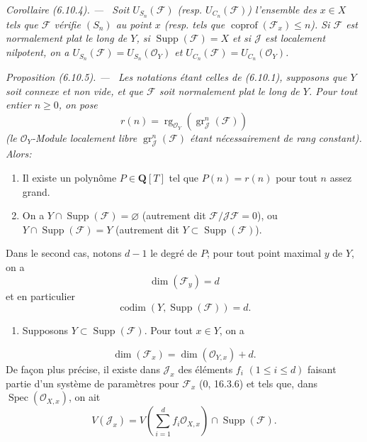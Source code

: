 \documentclass[10pt,oneside]{book}
\newenvironment{proposition}[1][]{%
  \par\medskip\noindent\itshape Proposition (#1). ---\ }{\par}
\newenvironment{corollary}[1][]{%
  \par\medskip\noindent\itshape Corollaire (#1). ---\ }{\par}
\begin{document}
\begin{corollary}[6.10.4]
\label{IV.2.s6.10.4-fr}
Soit $U_{S_n}(\mathcal F)$ (resp. $U_{C_n}(\mathcal F)$) l'ensemble des
$x\in X$ tels que $\mathcal F$ vérifie $(S_n)$ au point $x$ (resp. tels que
$\operatorname{coprof}(\mathcal F_x)\leq n$). Si $\mathcal F$ est normalement
plat le long de $Y$, si $\operatorname{Supp}(\mathcal F)=X$ et si $\mathcal J$
est localement nilpotent, on a
$U_{S_n}(\mathcal F)=U_{S_n}(\mathcal O_Y)$ et
$U_{C_n}(\mathcal F)=U_{C_n}(\mathcal O_Y)$.
\end{corollary}

\begin{proposition}[6.10.5]
\label{IV.2.s6.10.5-fr}
Les notations étant celles de (6.10.1), supposons que $Y$ soit connexe et non
vide, et que $\mathcal F$ soit normalement plat le long de $Y$. Pour tout
entier $n\geq0$, on pose
\begin{equation}
r(n)=\operatorname{rg}_{\mathcal O_Y}
(\operatorname{gr}_{\mathcal J}^{n}(\mathcal F))
\tag{6.10.5.1}\label{IV.2.s6.10.5.1-fr}
\end{equation}
(le $\mathcal O_Y$-Module localement libre
$\operatorname{gr}_{\mathcal J}^{n}(\mathcal F)$ étant nécessairement de rang
constant). Alors:
\begin{enumerate}
\item[(i)] Il existe un polynôme $P\in\mathbf Q[T]$ tel que $P(n)=r(n)$ pour
tout $n$ assez grand.
\item[(ii)] On a $Y\cap\operatorname{Supp}(\mathcal F)=\varnothing$
(autrement dit $\mathcal F/\mathcal J\mathcal F=0$), ou
$Y\cap\operatorname{Supp}(\mathcal F)=Y$ (autrement dit
$Y\subset\operatorname{Supp}(\mathcal F)$).
\end{enumerate}
Dans le second cas, notons $d-1$ le degré de $P$; pour tout point maximal $y$
de $Y$, on a
\begin{equation}
\dim(\mathcal F_y)=d
\tag{6.10.5.2}\label{IV.2.s6.10.5.2-fr}
\end{equation}
et en particulier
\begin{equation}
\operatorname{codim}(Y,\operatorname{Supp}(\mathcal F))=d.
\tag{6.10.5.3}\label{IV.2.s6.10.5.3-fr}
\end{equation}
\begin{enumerate}
\item[(iii)] Supposons $Y\subset\operatorname{Supp}(\mathcal F)$. Pour tout
$x\in Y$, on a
\end{enumerate}
\begin{equation}
\dim(\mathcal F_x)=\dim(\mathcal O_{Y,x})+d.
\tag{6.10.5.4}\label{IV.2.s6.10.5.4-fr}
\end{equation}
De façon plus précise, il existe dans $\mathcal J_x$ des éléments $f_i$
$(1\leq i\leq d)$ faisant partie d'un système de paramètres pour
$\mathcal F_x$ (0, 16.3.6) et tels que, dans
$\operatorname{Spec}(\mathcal O_{X,x})$, on ait
\[
V(\mathcal J_x)=V\left(\sum_{i=1}^{d}f_i\mathcal O_{X,x}\right)
\cap\operatorname{Supp}(\mathcal F).
\]
\end{proposition}
\end{document}
